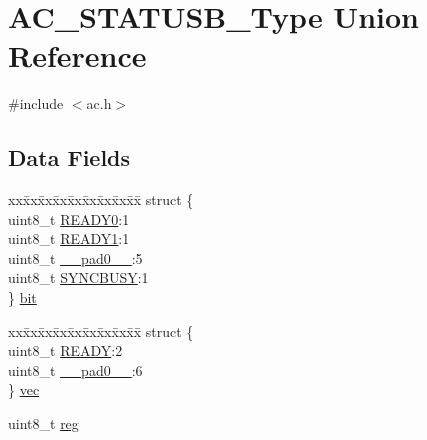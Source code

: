 \hypertarget{union_a_c___s_t_a_t_u_s_b___type}{}\section{A\+C\+\_\+\+S\+T\+A\+T\+U\+S\+B\+\_\+\+Type Union Reference}
\label{union_a_c___s_t_a_t_u_s_b___type}


{\ttfamily \#include $<$ac.\+h$>$}

\subsection*{Data Fields}
\begin{DoxyCompactItemize}
\item 
\begin{tabbing}
xx\=xx\=xx\=xx\=xx\=xx\=xx\=xx\=xx\=\kill
struct \{\\
\>uint8\_t \mbox{\hyperlink{union_a_c___s_t_a_t_u_s_b___type_afd00570f2f05cccc4376892b4aa16774}{READY0}}:1\\
\>uint8\_t \mbox{\hyperlink{union_a_c___s_t_a_t_u_s_b___type_a960615924a5af2e6165088391b19271c}{READY1}}:1\\
\>uint8\_t \mbox{\hyperlink{union_a_c___s_t_a_t_u_s_b___type_a8b4eebe79ded0459acec2f4950102ba3}{\_\_pad0\_\_}}:5\\
\>uint8\_t \mbox{\hyperlink{union_a_c___s_t_a_t_u_s_b___type_abb30254758e23bd24824e436a1aa8716}{SYNCBUSY}}:1\\
\} \mbox{\hyperlink{union_a_c___s_t_a_t_u_s_b___type_a2fa5fe37adbad41d864c40ea8864a14c}{bit}}\\

\end{tabbing}\item 
\begin{tabbing}
xx\=xx\=xx\=xx\=xx\=xx\=xx\=xx\=xx\=\kill
struct \{\\
\>uint8\_t \mbox{\hyperlink{union_a_c___s_t_a_t_u_s_b___type_a87c971ad119330af2fdb7bca4011addb}{READY}}:2\\
\>uint8\_t \mbox{\hyperlink{union_a_c___s_t_a_t_u_s_b___type_a8b4eebe79ded0459acec2f4950102ba3}{\_\_pad0\_\_}}:6\\
\} \mbox{\hyperlink{union_a_c___s_t_a_t_u_s_b___type_aea207f933470fb93821b99c2beabba83}{vec}}\\

\end{tabbing}\item 
uint8\+\_\+t \mbox{\hyperlink{union_a_c___s_t_a_t_u_s_b___type_a9428adc9af4653a2050e2536b55dec8d}{reg}}
\end{DoxyCompactItemize}


